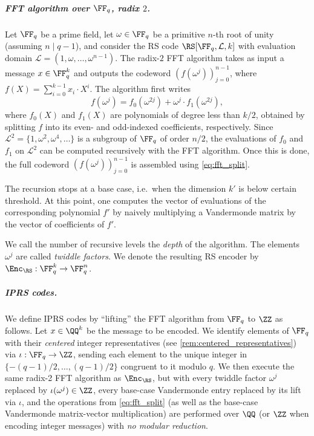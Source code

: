\subparagraph{FFT algorithm over $\FF_q$, radix $2$.} Let $\FF_q$ be a prime field, let $\omega\in\FF_q$ be a primitive $n$-th root of unity (assuming $n \mid q-1$), and consider the RS code $\RS[\FF_q,\mathcal{L},k]$ with evaluation domain $\mathcal{L} = (1,\omega,\ldots,\omega^{n-1})$. The radix-$2$ FFT algorithm takes as input a message $x\in\FF_q^k$ and outputs the codeword $(f(\omega^j))_{j=0}^{n-1}$, where $f(X)= \sum_{i=0}^{k-1} x_i \cdot X^{i}$. The algorithm first writes
%
\begin{equation}\label{eq:fft_split}
f(\omega^j)= f_0(\omega^{2j}) + \omega^j \cdot f_1(\omega^{2j}),
\end{equation}
where $f_0(X)$ and $f_1(X)$ are polynomials of degree less than $k/2$, obtained by splitting $f$ into its even- and odd-indexed coefficients, respectively. Since $\mathcal{L}^2 = \{1,\omega^2,\omega^4,\ldots\}$ is a subgroup of $\FF_q$ of order $n/2$, the evaluations of $f_0$ and $f_1$ on $\mathcal{L}^2$ can be computed recursively with the FFT algorithm. Once this is done, the full codeword $(f(\omega^j))_{j=0}^{n-1}$ is assembled using \eqref{eq:fft_split}.

The recursion stops at a base case, i.e.\ when the dimension $k'$ is below certain threshold. At this point, one computes the vector of evaluations of the corresponding polynomial $f'$ by naively multiplying a Vandermonde matrix by the vector of coefficients of $f'$.

We call the number of recursive levels the \emph{depth} of the algorithm. The elements $\omega^j$ are called \emph{twiddle factors}.  We denote the resulting RS encoder by $\Enc_{\RS} : \FF_q^k \to \FF_q^n$.



\subparagraph{IPRS codes.} We define IPRS codes  by ``lifting'' the FFT algorithm from $\FF_q$ to $\ZZ$ as follows. Let $x\in \QQ^k$ be the message to be encoded. We identify elements of $\FF_q$ with their \emph{centered} integer representatives (see \cref{rem:centered_representatives}) via $\iota : \FF_q \to \ZZ$, sending each element to the unique integer in $\{-(q-1)/2,\ldots,(q-1)/2\}$ congruent to it modulo $q$. We then execute the same radix-2 FFT algorithm as $\Enc_{\RS}$, but with every twiddle factor $\omega^j$ replaced by $\iota(\omega^j)\in\ZZ$, every base-case Vandermonde entry replaced by its lift via $\iota$, and the operations from \eqref{eq:fft_split} (as well as the base-case Vandermonde matrix-vector multiplication)  are performed over $\QQ$ (or $\ZZ$ when encoding integer messages) with \emph{no modular reduction}.

